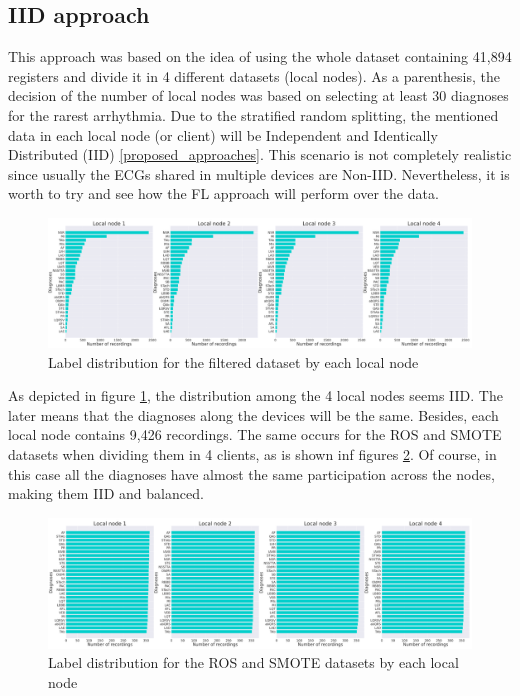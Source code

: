 \subsection{IID approach}

This approach was based on the idea of using the whole dataset containing 41,894 registers and divide it in 4 different datasets (local nodes). As a parenthesis, the decision of the number of local nodes was based on selecting at least 30 diagnoses for the rarest arrhythmia. Due to the stratified random splitting, the mentioned data in each local node (or client) will be Independent and Identically Distributed (IID) \ref{proposed_approaches}. This scenario is not completely realistic since usually the ECGs shared in multiple devices are Non-IID. Nevertheless, it is worth to try and see how the FL approach will perform over the data.

\begin{figure}[H]
\centering
\includegraphics[scale=0.4]{img/fl_label_distro_filtered.png}
\caption{Label distribution for the filtered dataset by each local node}
\label{fig:fl_label_distro_filtered}
\end{figure}

As depicted in figure \ref{fig:fl_label_distro_filtered}, the distribution among the 4 local nodes seems IID. The later means that the diagnoses along the devices will be the same. Besides, each local node contains 9,426 recordings. The same occurs for the ROS and SMOTE datasets when dividing them in 4 clients, as is shown inf figures \ref{fig:fl_label_distro_filtered_ROS_SMT}. Of course, in this case all the diagnoses have almost the same participation across the nodes, making them IID and balanced.

\begin{figure}[H]
\centering
\includegraphics[scale=0.4]{img/fl_label_distro_filtered_ROS_SMT.png}
\caption{Label distribution for the ROS and SMOTE datasets by each local node}
\label{fig:fl_label_distro_filtered_ROS_SMT}
\end{figure}

